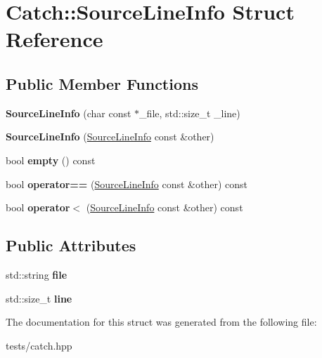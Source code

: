 \hypertarget{struct_catch_1_1_source_line_info}{}\section{Catch\+:\+:Source\+Line\+Info Struct Reference}
\label{struct_catch_1_1_source_line_info}
\subsection*{Public Member Functions}
\begin{DoxyCompactItemize}
\item 
\mbox{\label{struct_catch_1_1_source_line_info_a6218cb890337d37f708ea94063958940}} 
{\bfseries Source\+Line\+Info} (char const $\ast$\+\_\+file, std\+::size\+\_\+t \+\_\+line)
\item 
\mbox{\label{struct_catch_1_1_source_line_info_a1ec99cc0547ce5909133aaa8f14ed4b1}} 
{\bfseries Source\+Line\+Info} (\hyperlink{struct_catch_1_1_source_line_info}{Source\+Line\+Info} const \&other)
\item 
\mbox{\label{struct_catch_1_1_source_line_info_a05ab6444e9de7e9c3e76d8aa00093c3a}} 
bool {\bfseries empty} () const
\item 
\mbox{\label{struct_catch_1_1_source_line_info_a688e761986879266658f000f14ab8a42}} 
bool {\bfseries operator==} (\hyperlink{struct_catch_1_1_source_line_info}{Source\+Line\+Info} const \&other) const
\item 
\mbox{\label{struct_catch_1_1_source_line_info_a8b99a0d7b1553d8c2298c694db924be3}} 
bool {\bfseries operator$<$} (\hyperlink{struct_catch_1_1_source_line_info}{Source\+Line\+Info} const \&other) const
\end{DoxyCompactItemize}
\subsection*{Public Attributes}
\begin{DoxyCompactItemize}
\item 
\mbox{\label{struct_catch_1_1_source_line_info_adf3ccf0c2bd326eb3466318af82a94dd}} 
std\+::string {\bfseries file}
\item 
\mbox{\label{struct_catch_1_1_source_line_info_a841e5d696c7b9cde24e45e61dd979c77}} 
std\+::size\+\_\+t {\bfseries line}
\end{DoxyCompactItemize}


The documentation for this struct was generated from the following file\+:\begin{DoxyCompactItemize}
\item 
tests/catch.\+hpp\end{DoxyCompactItemize}
